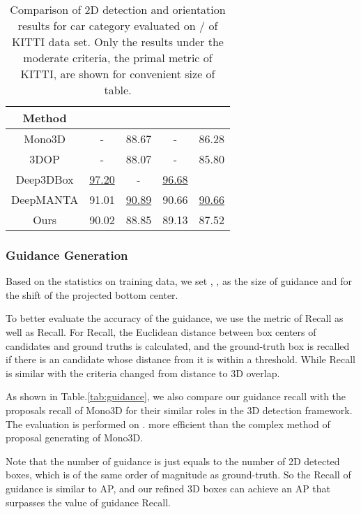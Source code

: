 \documentclass[10pt,twocolumn,letterpaper]{article}
\begin{document}
\begin{table}[!ht]
\begin{center}
\footnotesize
\begin{tabular}{| c | c@{/}c | c@{/}c |}
\hline
Method & \multicolumn{2}{c|}{} & \multicolumn{2}{c|}{} \\
\hline
Mono3D \cite{mono3d} &- & 88.67  &- & 86.28  \\
3DOP \cite{3dop} &- & 88.07 &- & 85.80  \\
Deep3DBox \cite{deep3dbox} & \underline{97.20} & - & \underline{96.68} &  \\
DeepMANTA \cite{deepmanta} & 91.01 & \underline{90.89}  & 90.66 & \underline{90.66}  \\
\hline
Ours & 90.02 & 88.85 & 89.13 & 87.52 \\
\hline
\end{tabular}
\vspace{1.5mm}
\caption{Comparison of 2D detection and orientation results for car category evaluated on  /  of KITTI data set. Only the results under the moderate criteria, the primal metric of KITTI, are shown for convenient size of table.}
\label{tab:2d}
\end{center}
\end{table}

\subsubsection{Guidance Generation}
Based on the statistics on training data, we set , ,  as the size of guidance and  for the shift of the projected bottom center.

To better evaluate the accuracy of the guidance, we use the metric of Recall as well as Recall. For Recall, the Euclidean distance between box centers of candidates and ground truths is calculated, and the ground-truth box is recalled if there is an candidate whose distance from it is within a threshold. While Recall is similar with the criteria changed from distance to 3D overlap.

As shown in Table.\ref{tab:guidance}, we also compare our guidance recall with the proposals recall of Mono3D \cite{mono3d} for their similar roles in the 3D detection framework. The evaluation is performed on .  more efficient than the complex method of proposal generating of Mono3D.

Note that the number of guidance is just equals to the number of 2D detected boxes, which is of the same order of magnitude as ground-truth. So the Recall of guidance is similar to AP, and our refined 3D boxes can achieve an AP that surpasses the value of guidance Recall.
\end{document}
